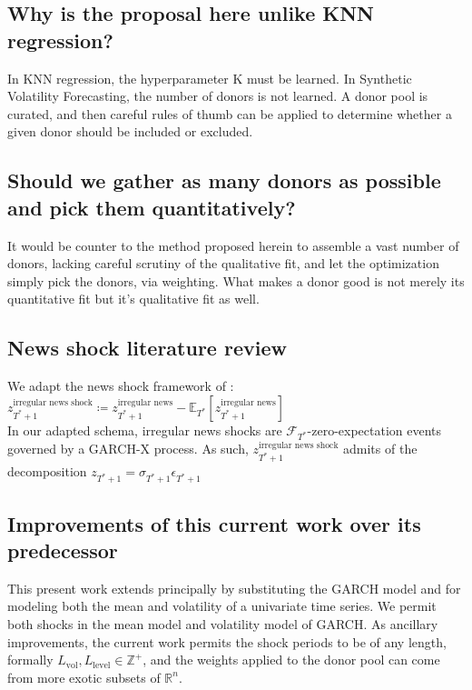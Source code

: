 \documentclass[11pt]{article}
\def\E{\mathbb{E}} %
\theoremstyle{definition}
\begin{document}
\subsection{Why is the proposal here unlike KNN regression?}
In KNN regression, the hyperparameter K must be learned.  In Synthetic Volatility Forecasting, the number of donors is not learned.  A donor pool is curated, and then careful rules of thumb can be applied to determine whether a given donor should be included or excluded. 

\subsection{Should we gather as many donors as possible and pick them quantitatively?}
It would be counter to the method proposed herein to assemble a vast number of donors, lacking careful scrutiny of the qualitative fit, and let the optimization simply pick the donors, via weighting.  What makes a donor good is not merely its quantitative fit but it's qualitative fit as well.

\subsection{News shock literature review}

We adapt the news shock framework of \citet{kilian2017structural}: \\

$z_{T^{*}+1}^{\text{irregular news shock}} \coloneqq z_{T^{*}+1}^{\text{irregular news}} - \E_{T^{*}}[z_{T^{*}+1}^{\text{irregular news}}]$ \\

In our adapted schema, irregular news shocks are $\mathcal{F}_{T^{*}}$-zero-expectation events governed by a GARCH-X process.  As such, $z_{T^{*}+1}^{\text{irregular news shock}}$ admits of the decomposition $z_{T^{*}+1} = \sigma_{T^{*}+1}\epsilon_{T^{*}+1}$

\subsection{Improvements of this current work over its predecessor}
This present work extends \citet{lin2021minimizing} principally by substituting the GARCH model and for modeling both the mean and volatility of a univariate time series.  We permit both shocks in the mean model and volatility model of GARCH.  As ancillary improvements, the current work permits the shock periods to be of any length, formally $L_{\text{vol}}, L_{\text{level}} \in \mathbb{Z}^{+}$, and the weights applied to the donor pool can come from more exotic subsets of $\mathbb{R}^{n}$.  
\end{document}
